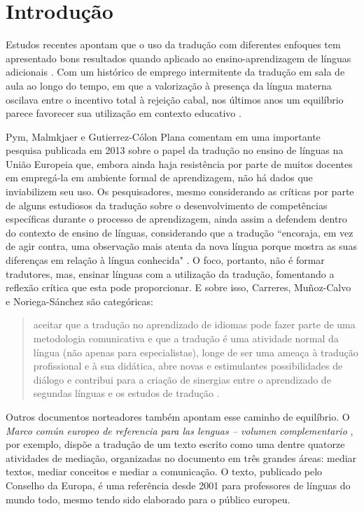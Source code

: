 \documentclass[portuguese]{textolivre}
\begin{document}
\section{Introdução}
Estudos recentes apontam que o uso da tradução com diferentes enfoques tem apresentado bons resultados quando aplicado ao ensino-aprendizagem de línguas adicionais \cite{carreres2019, pintado2019, bergmann2024}. Com um histórico de emprego intermitente da tradução em sala de aula ao longo do tempo, em que a valorização à presença da língua materna oscilava entre o incentivo total à rejeição cabal, nos últimos anos um equilíbrio parece favorecer sua utilização em contexto e\-ducativo \cite{bergmann2024}.

Pym, Malmkjaer e Gutierrez-Cólon Plana comentam em uma importante pesquisa publicada em 2013 sobre o papel da tradução no ensino de línguas na União Europeia que, embora ainda haja resistência por parte de muitos docentes em empregá-la em ambiente formal de aprendizagem, não há dados que inviabilizem seu uso. Os pesquisadores, mesmo considerando as críticas por parte de alguns estudiosos da tradução sobre o desenvolvimento de competências específicas durante o processo de aprendizagem, ainda assim a defendem dentro do contexto de ensino de línguas, considerando que a tradução “encoraja, em vez de agir contra, uma observação mais atenta da nova língua porque mostra as suas diferenças em relação à língua conhecida" \cite[p. 18, tradução nossa]{pym2013}.
O foco, portanto, não é formar tradutores, mas, ensinar línguas com a utilização da tradução, fomentando a reflexão crítica que esta pode proporcionar. E sobre isso, Carreres, Muñoz-Calvo e Noriega-Sánchez são categóricas:

\begin{quote}
aceitar que a tradução no aprendizado de idiomas pode fazer parte de uma metodologia comunicativa e que a tradução é uma atividade normal da língua (não apenas para especialistas), longe de ser uma ameaça à tradução profissional e à sua didática, abre novas e estimulantes possibilidades de diálogo e contribui para a criação de sinergias entre o aprendizado de segundas línguas e os estudos de tradução \cite[p. 102, tradução nossa]{carreres2017}.
\end{quote}

Outros documentos norteadores também apontam esse caminho de equilíbrio. O \textit{Marco común europeo de referencia para las lenguas – volumen complementario} \cite{consejo2022}, por exemplo, dispõe a tradução de um texto escrito como uma dentre quatorze atividades de mediação, organizadas no documento em três grandes áreas: mediar textos, mediar conceitos e mediar a comunicação. O texto, publicado pelo Conselho da Europa, é uma referência desde 2001 para professores de línguas do mundo todo, mesmo tendo sido elaborado para o público europeu.
\end{document}
